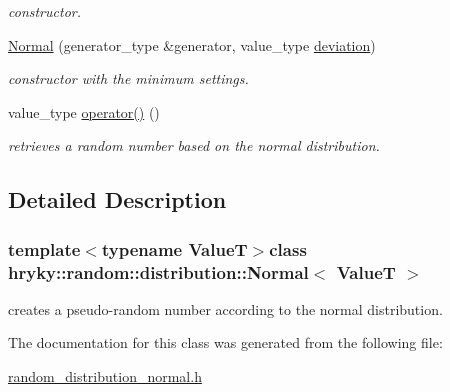 \begin{DoxyCompactItemize}
\begin{DoxyCompactList}\small\item\em constructor. \end{DoxyCompactList}\item 
\hypertarget{classhryky_1_1random_1_1distribution_1_1_normal_a3c4d62bf2fe6b4411a20d68a6c8f3da9}{\hyperlink{classhryky_1_1random_1_1distribution_1_1_normal_a3c4d62bf2fe6b4411a20d68a6c8f3da9}{Normal} (generator\-\_\-type \&generator, value\-\_\-type \hyperlink{classhryky_1_1random_1_1distribution_1_1_normal_a421514c36ee40e90a9de30917ca6af08}{deviation})}\label{classhryky_1_1random_1_1distribution_1_1_normal_a3c4d62bf2fe6b4411a20d68a6c8f3da9}

\begin{DoxyCompactList}\small\item\em constructor with the minimum settings. \end{DoxyCompactList}\item 
\hypertarget{classhryky_1_1random_1_1distribution_1_1_normal_aabd419dba5f1af0d5b661619c49632da}{value\-\_\-type \hyperlink{classhryky_1_1random_1_1distribution_1_1_normal_aabd419dba5f1af0d5b661619c49632da}{operator()} ()}\label{classhryky_1_1random_1_1distribution_1_1_normal_aabd419dba5f1af0d5b661619c49632da}

\begin{DoxyCompactList}\small\item\em retrieves a random number based on the normal distribution. \end{DoxyCompactList}\end{DoxyCompactItemize}


\subsection{Detailed Description}
\subsubsection*{template$<$typename Value\-T$>$class hryky\-::random\-::distribution\-::\-Normal$<$ Value\-T $>$}

creates a pseudo-\/random number according to the normal distribution. 

The documentation for this class was generated from the following file\-:\begin{DoxyCompactItemize}
\item 
\hyperlink{random__distribution__normal_8h}{random\-\_\-distribution\-\_\-normal.\-h}\end{DoxyCompactItemize}
